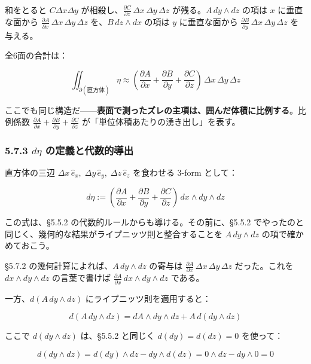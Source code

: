 \documentclass[a4paper,12pt,openany]{book}
\begin{document}
和をとると \(C\Delta x\Delta y\)
が相殺し、\(\frac{\partial C}{\partial z}\,\Delta x\,\Delta y\,\Delta z\)
が残る。\(A\,dy \wedge dz\) の項は \(x\) に垂直な面から
\(\frac{\partial A}{\partial x}\,\Delta x\,\Delta y\,\Delta z\)
を、\(B\,dz \wedge dx\) の項は \(y\) に垂直な面から
\(\frac{\partial B}{\partial y}\,\Delta x\,\Delta y\,\Delta z\)
を与える。

全6面の合計は：

\[\iint_{\partial (\text{直方体})} \eta \approx (\frac{\partial A}{\partial x} + \frac{\partial B}{\partial y} + \frac{\partial C}{\partial z})\,\Delta x\,\Delta y\,\Delta z\]

ここでも同じ構造だ——\textbf{表面で測ったズレの主項は、囲んだ体積に比例する}。比例係数
\(\frac{\partial A}{\partial x} + \frac{\partial B}{\partial y} + \frac{\partial C}{\partial z}\)
が「単位体積あたりの湧き出し」を表す。

\hypertarget{deta-ux306eux5b9aux7fa9ux3068ux4ee3ux6570ux7684ux5c0eux51fa}{%
\subsubsection{\texorpdfstring{5.7.3 \(d\eta\)
の定義と代数的導出}{5.7.3 d\textbackslash eta の定義と代数的導出}}\label{deta-ux306eux5b9aux7fa9ux3068ux4ee3ux6570ux7684ux5c0eux51fa}}

直方体の三辺
\(\Delta x\,\hat{e}_x,\; \Delta y\,\hat{e}_y,\; \Delta z\,\hat{e}_z\)
を食わせる \(3\)-form として：

\[d\eta := (\frac{\partial A}{\partial x} + \frac{\partial B}{\partial y} + \frac{\partial C}{\partial z})\,dx \wedge dy \wedge dz\]

この式は、§5.5.2 の代数的ルールからも導ける。その前に、§5.5.2
でやったのと同じく、幾何的な結果がライプニッツ則と整合することを
\(A\,dy \wedge dz\) の項で確かめておこう。

§5.7.2 の幾何計算によれば、\(A\,dy \wedge dz\) の寄与は
\(\frac{\partial A}{\partial x}\,\Delta x\,\Delta y\,\Delta z\)
だった。これを \(dx \wedge dy \wedge dz\) の言葉で書けば
\(\frac{\partial A}{\partial x}\,dx \wedge dy \wedge dz\) である。

一方、\(d(A\,dy \wedge dz)\) にライプニッツ則を適用すると：

\[d(A\,dy \wedge dz) = dA \wedge dy \wedge dz + A\,d(dy \wedge dz)\]

ここで \(d(dy \wedge dz)\) は、§5.5.2 と同じく \(d(dy)=d(dz)=0\)
を使って：

\[d(dy \wedge dz) = d(dy) \wedge dz - dy \wedge d(dz) = 0 \wedge dz - dy \wedge 0 = 0\]
\end{document}
